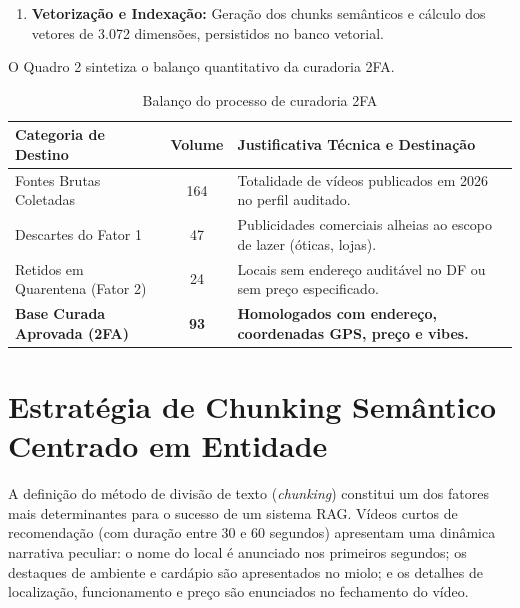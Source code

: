 \documentclass[11pt,a4paper]{article}
\begin{document}
\begin{enumerate}[label=\alph*)]
\begin{itemize}
\item \textit{Trava 2 (Orçamento Objetivo):} Exigência de valor monetário médio explícito por pessoa (em Reais) e enquadramento em faixa de custo (Barato, Moderado ou Caro).
\end{itemize}
Os registros que falharam em qualquer uma das duas travas (24 vídeos com ausência de preço exato ou sem endereço pontual) foram encaminhados à fila de quarentena (\textit{data/fila\_quarentena\_2fa.json}). Os 93 estabelecimentos aprovados simultaneamente em ambos os fatores integraram a base oficial (\textit{data/banco\_aprovado\_2fa.json}).
\item \textbf{Vetorização e Indexação:} Geração dos chunks semânticos e cálculo dos vetores de 3.072 dimensões, persistidos no banco vetorial.
\end{enumerate}

O Quadro 2 sintetiza o balanço quantitativo da curadoria 2FA.

\begin{table}[!htbp]
\centering
\small
\renewcommand{\arraystretch}{1.03}
\caption{Balanço do processo de curadoria 2FA}
\begin{tabularx}{\textwidth}{X c p{7.5cm}}
\toprule
\textbf{Categoria de Destino} & \textbf{Volume} & \textbf{Justificativa Técnica e Destinação} \\
\midrule
Fontes Brutas Coletadas & 164 & Totalidade de vídeos publicados em 2026 no perfil auditado. \\
Descartes do Fator 1 & 47 & Publicidades comerciais alheias ao escopo de lazer (óticas, lojas). \\
Retidos em Quarentena (Fator 2) & 24 & Locais sem endereço auditável no DF ou sem preço especificado. \\
\textbf{Base Curada Aprovada (2FA)} & \textbf{93} & \textbf{Homologados com endereço, coordenadas GPS, preço e vibes.} \\
\bottomrule
\end{tabularx}
\vspace{0.1cm}
\end{table}

\section{Estratégia de Chunking Semântico Centrado em Entidade}

A definição do método de divisão de texto (\textit{chunking}) constitui um dos fatores mais determinantes para o sucesso de um sistema RAG. Vídeos curtos de recomendação (com duração entre 30 e 60 segundos) apresentam uma dinâmica narrativa peculiar: o nome do local é anunciado nos primeiros segundos; os destaques de ambiente e cardápio são apresentados no miolo; e os detalhes de localização, funcionamento e preço são enunciados no fechamento do vídeo.
\end{document}
